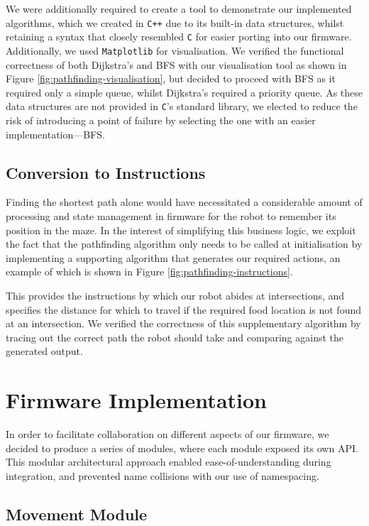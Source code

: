 \documentclass[conference]{IEEEtran}
\begin{document}
We were additionally required to create a tool to demonstrate our implemented algorithms, which we created in \texttt{C++} due to its built-in data structures, whilst retaining a syntax that closely resembled \texttt{C} for easier porting into our firmware.
Additionally, we used \texttt{Matplotlib} for visualisation.
We verified the functional correctness of both Dijkstra's and BFS with our visualisation tool as shown in Figure \ref{fig:pathfinding-visualisation}, but decided to proceed with BFS as it required only a simple queue, whilst Dijkstra's required a priority queue.
As these data structures are not provided in \texttt{C}'s standard library, we elected to reduce the risk of introducing a point of failure by selecting the one with an easier implementation—BFS.

\subsection{Conversion to Instructions}

Finding the shortest path alone would have necessitated a considerable amount of processing and state management in firmware for the robot to remember its position in the maze.
In the interest of simplifying this business logic, we exploit the fact that the pathfinding algorithm only needs to be called at initialisation by implementing a supporting algorithm that generates our required actions, an example of which is shown in Figure \ref{fig:pathfinding-instructions}.

This provides the instructions by which our robot abides at intersections, and specifies the distance for which to travel if the required food location is not found at an intersection.
We verified the correctness of this supplementary algorithm by tracing out the correct path the robot should take and comparing against the generated output.



\section{Firmware Implementation}

In order to facilitate collaboration on different aspects of our firmware, we decided to produce a series of modules, where each module exposed its own API.
This modular architectural approach enabled ease-of-understanding during integration, and prevented name collisions with our use of namespacing.

\subsection{Movement Module}
\end{document}
